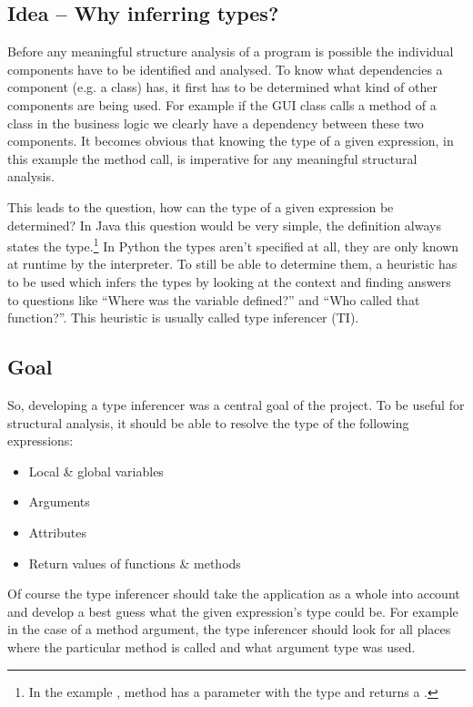 \documentclass[12pt,halfparskip]{scrreprt}
\begin{document}
\subsection{Idea – Why inferring types?}

Before any meaningful structure analysis of a program is possible the individual components have to be identified and analysed. To know what dependencies a component (e.g. a class) has, it first has to be determined what kind of other components are being used. For example if the GUI class calls a method of a class in the business logic we clearly have a dependency between these two components. It becomes obvious that knowing the type of a given expression, in this example the method call, is imperative for any meaningful structural analysis.

This leads to the question, how can the type of a given expression be determined? In Java this question would be very simple, the definition always states the type.\footnote{In the example , method  has a parameter  with the type  and returns a .} In Python the types aren't specified at all, they are only known at runtime by the interpreter. To still be able to determine them, a heuristic has to be used which infers the types by looking at the context and finding answers to questions like ``Where was the variable defined?'' and ``Who called that function?''. This heuristic is usually called type inferencer (TI).

\subsection{Goal}

So, developing a type inferencer was a central goal of the project. To be useful for structural analysis, it should be able to resolve the type of the following expressions:

\begin{itemize}
	\item Local \& global variables
	\item Arguments
	\item Attributes
	\item Return values of functions \& methods
\end{itemize}

Of course the type inferencer should take the application as a whole into account and develop a best guess what the given expression's type could be. For example in the case of a method argument, the type inferencer should look for all places where the particular method is called and what argument type was used.
\end{document}

